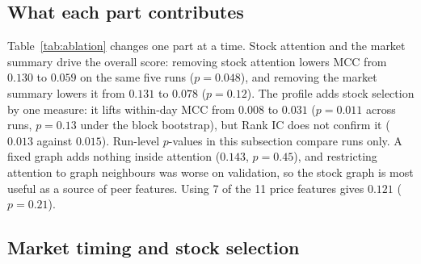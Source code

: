 \documentclass[conference]{IEEEtran}
\begin{document}
\subsection{What each part contributes}
\label{sec:ablation}

\begin{table}[t]
\caption{Ablation study (standard test period). One change per row; number of runs
in parentheses.}
\label{tab:ablation}
\centering
{}
\end{table}

Table~\ref{tab:ablation} changes one part at a time. Stock attention and the market
summary drive the overall score: removing stock attention lowers MCC from $0.130$ to
$0.059$ on the same five runs ($p=0.048$), and removing the market summary lowers it
from $0.131$ to $0.078$ ($p=0.12$). The profile adds stock selection by one measure:
it lifts within-day MCC from $0.008$ to $0.031$ ($p=0.011$ across runs, $p=0.13$
under the block bootstrap), but Rank IC does not confirm it ($0.013$ against
$0.015$). Run-level $p$-values in this subsection compare runs only.
A fixed graph adds nothing inside attention ($0.143$, $p=0.45$), and restricting
attention to graph neighbours was worse on validation, so the stock graph is most
useful as a source of peer features. Using 7 of the 11 price features gives $0.121$
($p=0.21$).

\subsection{Market timing and stock selection}
\end{document}
